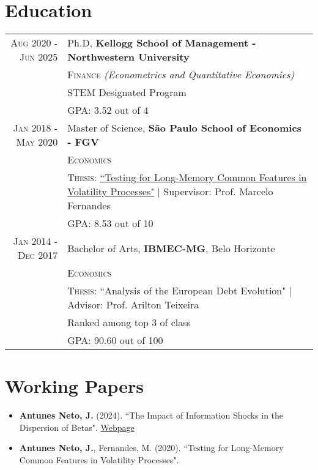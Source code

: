 \documentclass[a4paper,10pt]{article}
\begin{document}
\section{Education}
\begin{tabular}{r|p{8.75cm}}	
    \textsc{Aug} 2020 - \textsc{Jun} 2025 & Ph.D, \normalsize\textbf{Kellogg School of Management - Northwestern University} \\
    & \textsc{Finance} \textit{(Econometrics and Quantitative Economics)} \\
    & \normalsize \textsc{STEM} Designated Program \\
    & \normalsize \textsc{GPA}: 3.52 out of 4 \\
    \textsc{Jan} 2018 - \textsc{May} 2020 & Master of Science, \normalsize\textbf{São Paulo School of Economics - FGV} \\
    & \textsc{Economics} \\
    & \normalsize \textsc{Thesis}: \href{http://hdl.handle.net/10438/29188}{``Testing for Long-Memory Common Features in Volatility Processes"} | \small Supervisor: Prof. Marcelo Fernandes \\ 
    &\normalsize \textsc{GPA}: 8.53 out of 10
    \\
    \textsc{Jan} 2014 - \textsc{Dec} 2017& Bachelor of Arts, \normalsize\textbf{IBMEC-MG}, Belo Horizonte \\
    & \textsc{Economics} \\
    & \normalsize \textsc{Thesis}: ``Analysis of the European Debt Evolution" | \small Advisor: Prof. Arilton Teixeira \\
    & \normalsize{Ranked among top 3 of class} \\
    &\normalsize \textsc{GPA}: 90.60 out of 100
\end{tabular}


\section{Working Papers}
\begin{itemize}
    \item \textbf{Antunes Neto, J.} (2024). ``The Impact of Information Shocks in the Dispersion of Betas". \href{https://joseparreiras.github.io/projects/news-and-betas}{Webpage}
    \item \textbf{Antunes Neto, J.}, Fernandes, M. (2020). ``Testing for Long-Memory Common Features in Volatility Processes".
\end{itemize}
\end{document}
